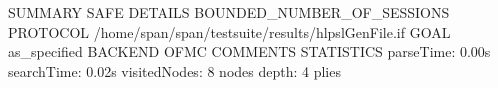 SUMMARY
  SAFE
DETAILS
  BOUNDED_NUMBER_OF_SESSIONS
PROTOCOL
  /home/span/span/testsuite/results/hlpslGenFile.if
GOAL
  as_specified
BACKEND
  OFMC
COMMENTS
STATISTICS
  parseTime: 0.00s
  searchTime: 0.02s
  visitedNodes: 8 nodes
  depth: 4 plies